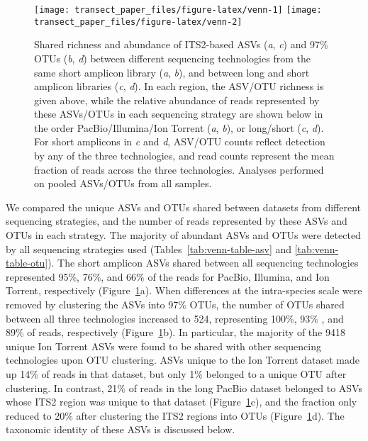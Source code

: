 \documentclass[
  12pt,
]{article}
\begin{document}
\begin{figure}

{\centering \texttt{[image: transect\_paper\_files/figure-latex/venn-1]} \texttt{[image: transect\_paper\_files/figure-latex/venn-2]} 

}

\caption[Shared richness and abundance of ASVs and OTUs between different sequencing technologies]{Shared richness and abundance of ITS2-based ASVs (\emph{a}, \emph{c}) and 97\% OTUs (\emph{b}, \emph{d}) between different sequencing technologies from the same short amplicon library (\emph{a}, \emph{b}), and between long and short amplicon libraries (\emph{c}, \emph{d}).
In each region, the ASV/OTU richness is given above, while the relative abundance of reads represented by these ASVs/OTUs in each sequencing strategy are shown below in the order PacBio/Illumina/Ion Torrent (\emph{a}, \emph{b}), or long/short (\emph{c}, \emph{d}).
For short amplicons in \emph{c} and \emph{d}, ASV/OTU counts reflect detection by any of the three technologies, and read counts represent the mean fraction of reads across the three technologies. Analyses performed on pooled ASVs/OTUs from all samples.}\label{fig:venn}
\end{figure}

We compared the unique ASVs and OTUs shared between datasets from different sequencing strategies, and the number of reads represented by these ASVs and OTUs in each strategy.
The majority of abundant ASVs and OTUs were detected by all sequencing strategies used (Tables~\ref{tab:venn-table-asv} and \ref{tab:venn-table-otu}).
The short amplicon ASVs shared between all sequencing technologies represented 95\%, 76\%, and 66\% of the reads for PacBio, Illumina, and Ion Torrent, respectively (Figure~\ref{fig:venn}a).
When differences at the intra-species scale were removed by clustering the ASVs into 97\% OTUs, the number of OTUs shared between all three technologies increased to 524, representing 100\%, 93\% , and 89\% of reads, respectively (Figure~\ref{fig:venn}b).
In particular, the majority of the 9418 unique Ion Torrent ASVs were found to be shared with other sequencing technologies upon OTU clustering.
ASVs unique to the Ion Torrent dataset made up 14\% of reads in that dataset, but only 1\% belonged to a unique OTU after clustering.
In contrast, 21\% of reads in the long PacBio dataset belonged to ASVs whose ITS2 region was unique to that dataset (Figure~\ref{fig:venn}c), and the fraction only reduced to 20\% after clustering the ITS2 regions into OTUs (Figure~\ref{fig:venn}d).
The taxonomic identity of these ASVs is discussed below.
\end{document}
